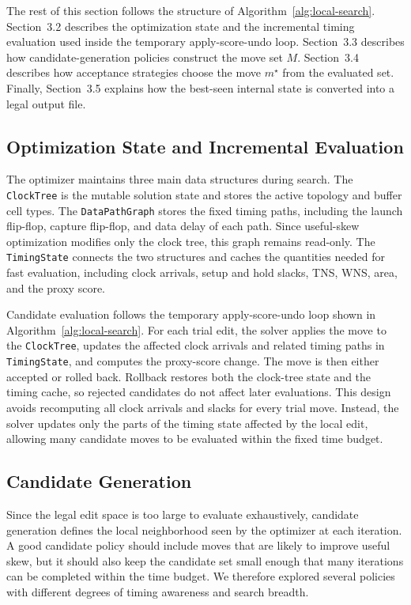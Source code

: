 \documentclass{article}
\begin{document}
The rest of this section follows the structure of Algorithm~\ref{alg:local-search}. Section~3.2 describes the optimization state and the incremental timing evaluation used inside the temporary apply-score-undo loop. Section~3.3 describes how candidate-generation policies construct the move set $M$. Section~3.4 describes how acceptance strategies choose the move $m^\star$ from the evaluated set. Finally, Section~3.5 explains how the best-seen internal state is converted into a legal output file.
\subsection{Optimization State and Incremental Evaluation}

The optimizer maintains three main data structures during search. The \texttt{ClockTree} is the mutable solution state and stores the active topology and buffer cell types. The \texttt{DataPathGraph} stores the fixed timing paths, including the launch flip-flop, capture flip-flop, and data delay of each path. Since useful-skew optimization modifies only the clock tree, this graph remains read-only. The \texttt{TimingState} connects the two structures and caches the quantities needed for fast evaluation, including clock arrivals, setup and hold slacks, TNS, WNS, area, and the proxy score.

Candidate evaluation follows the temporary apply-score-undo loop shown in Algorithm~\ref{alg:local-search}. For each trial edit, the solver applies the move to the \texttt{ClockTree}, updates the affected clock arrivals and related timing paths in \texttt{TimingState}, and computes the proxy-score change. The move is then either accepted or rolled back. Rollback restores both the clock-tree state and the timing cache, so rejected candidates do not affect later evaluations.
This design avoids recomputing all clock arrivals and slacks for every trial move. Instead, the solver updates only the parts of the timing state affected by the local edit, allowing many candidate moves to be evaluated within the fixed time budget.

\subsection{Candidate Generation}

Since the legal edit space is too large to evaluate exhaustively, candidate generation defines the local neighborhood seen by the optimizer at each iteration. A good candidate policy should include moves that are likely to improve useful skew, but it should also keep the candidate set small enough that many iterations can be completed within the time budget. We therefore explored several policies with different degrees of timing awareness and search breadth.
\end{document}
